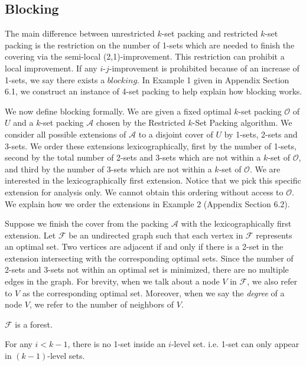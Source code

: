\documentclass[runningheads,a4paper]{llncs}
\numberwithin{equation}{section}
\begin{document}
\subsection{Blocking}

The main difference between unrestricted $k$-set packing and restricted $k$-set packing is the restriction on the number of 1-sets which are needed to finish the covering via the semi-local (2,1)-improvement. This restriction can prohibit a local improvement. If any $i$-$j$-improvement is prohibited because of an increase of 1-sets, we say there exists a $blocking$. In Example 1 given in Appendix Section 6.1, we construct an instance of 4-set packing to help explain how blocking works.

We now define blocking formally. We are given a fixed optimal $k$-set packing $\mathscr{O}$ of $U$ and a $k$-set packing $\mathscr{A}$ chosen by the Restricted $k$-Set Packing algorithm. We consider all possible extensions of $\mathscr{A}$ to a disjoint cover of $U$ by 1-sets, 2-sets and 3-sets. We order these extensions lexicographically, first by the number of 1-sets, second by the total number of 2-sets and 3-sets which are not within a $k$-set of $\mathscr{O}$, and third by the number of 3-sets which are not within a $k$-set of $\mathscr{O}$. We are interested in the lexicographically first extension. Notice that we pick this specific extension for analysis only. We cannot obtain this ordering without access to $\mathscr{O}$. We explain how we order the extensions in Example 2 (Appendix Section 6.2).

Suppose we finish the cover from the packing $\mathscr{A}$ with the lexicographically first extension. Let $\mathscr{F}$ be an undirected graph such that each vertex in $\mathscr{F}$ represents an optimal set. Two vertices are adjacent if and only if there is a 2-set in the extension intersecting with the corresponding optimal sets. Since the number of 2-sets and 3-sets not within an optimal set is minimized, there are no multiple edges in the graph. For brevity, when we talk about a node $V$ in $\mathscr{F}$, we also refer to $V$ as the corresponding optimal set. Moreover, when we say the \emph{degree} of a node $V$, we refer to the number of neighbors of $V$.


\begin{proposition}
$\mathscr{F}$ is a forest.
\end{proposition}

\begin{proposition}
For any $i<k-1$, there is no 1-set inside an $i$-level set. i.e. 1-set can only appear in $(k-1)$-level sets.
\end{proposition}
\end{document}
